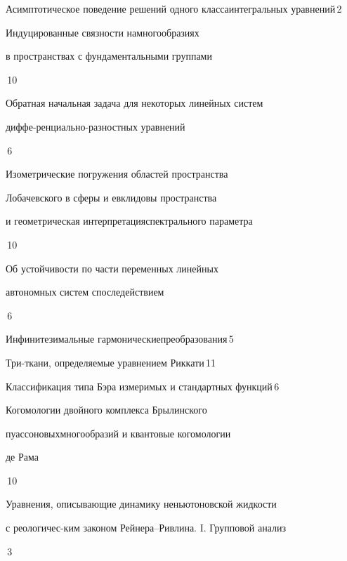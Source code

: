 

{Асимптотическое поведение решений одного класса\newline интегральных уравнений}{\No\,2}




{Индуцированные связности на\newline многообразиях


в пространствах с фундаментальными группами}{\No\,10}




{Обратная начальная задача для некоторых линейных систем


диффе-\newline ренциально-разностных уравнений}{\No\,6}




{Изометрические погружения областей пространства\newline


Лобачевского в сферы и евклидовы пространства


и геометрическая интерпретация\newline  спектрального параметра}{\No\,10}




{Об устойчивости по части переменных линейных  


автономных систем с\newline последействием}{\No\,6}




{Инфинитезимальные гармонические\newline преобразования}{\No\,5}




{Три-ткани, определяемые уравнением Риккати}{\No\,11}




{Классификация типа Бэра измеримых и стандартных функций}{\No\,6}




{Когомологии двойного комплекса Брылинского


пуассоновых\newline многообразий и квантовые когомологии


де Рама}{\No\,10}




{Уравнения, описывающие динамику неньютоновской жидкости


с реологичес-\newline ким законом Рейнера--Ривлина. I. Групповой анализ}{\No\,3}


